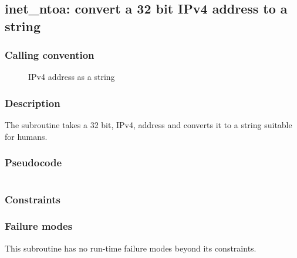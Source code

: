 \clearpage
{}
{}
\label{subr:inet-ntoa}
\subsection*{inet\_ntoa: convert a 32 bit IPv4 address to a string}

\subsubsection*{Calling convention}

\begin{description}
\item[] IPv4 address as a string
\end{description}

\subsubsection*{Description}

The  subroutine takes a 32 bit, IPv4, address
and converts it to a string suitable for humans.

\subsubsection*{Pseudocode}

\begin{verbatim}
\end{verbatim}

\subsubsection*{Constraints}

\subsubsection*{Failure modes}

This subroutine has no run-time failure modes beyond its constraints.
